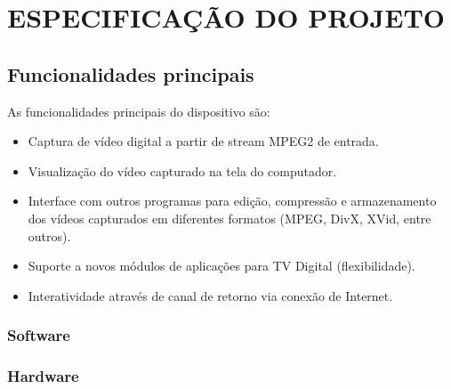 \chapter{ESPECIFICAÇÃO DO PROJETO}

\section{Funcionalidades principais}

As funcionalidades principais do dispositivo são:

\begin{itemize}

	\item Captura de vídeo digital a partir de stream MPEG2 de entrada.

	\item Visualização do vídeo capturado na tela do computador.

	\item Interface com outros programas para edição, compressão e armazenamento dos vídeos capturados em diferentes formatos (MPEG, DivX, XVid, entre outros).

	\item Suporte a novos módulos de aplicações para TV Digital (flexibilidade).

	\item Interatividade através de canal de retorno via conexão de Internet.
\end{itemize}

\subsection{Software}
\subsection{Hardware}
